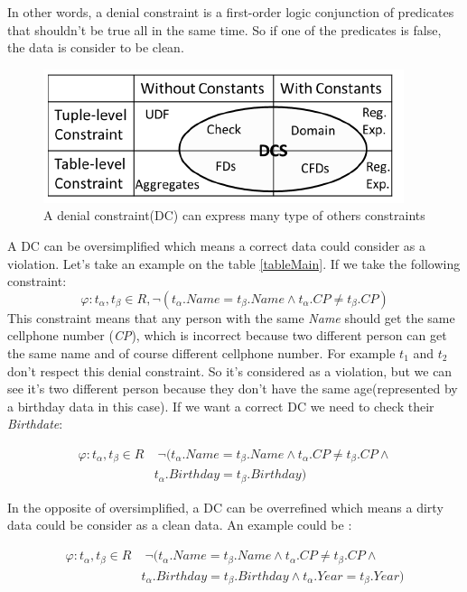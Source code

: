 \documentclass[letterpaper, 12pt]{report}
\begin{document}
In other words, a denial constraint is a first-order logic conjunction of predicates that shouldn't be true all in the same time. So if one of the predicates is false, the data is consider to be clean. \\

\begin{figure}
	\centering
	\includegraphics[scale=1]{img/quadran.png}
	\caption{A denial constraint(DC) can express many type of others constraints}
\end{figure}
A DC can be oversimplified which means a correct data could consider as a violation. Let's take an example on the table \ref{tableMain}. If we take the following constraint:
$$ \varphi : t_\alpha,t_\beta \in R, \neg(t_\alpha.Name = t_\beta.Name \wedge t_\alpha.CP \neq t_\beta.CP)$$
This constraint means that any person with the same \emph{Name} should get the same cellphone number (\emph{CP}), which is incorrect because two different person can get the same name and of course different cellphone number. For example $t_1$ and $t_2$ don't respect this denial constraint. So it's considered as a violation, but we can see it's two different person because they don't have the same age(represented by a birthday data in this case). If we want a correct DC we need to check their \emph{Birthdate}:

\begin{displaymath}
  \begin{split}
    \varphi : t_\alpha,t_\beta \in R &\; \neg(t_\alpha.Name = t_\beta.Name \wedge t_\alpha.CP \neq t_\beta.CP \wedge \\
    & t_\alpha.Birthday = t_\beta.Birthday)
  \end{split}
\end{displaymath}

In the opposite of oversimplified, a DC can be overrefined which means a dirty data could be consider as a clean data. An example could be :

\begin{displaymath}
  \begin{split}
    \varphi : t_\alpha,t_\beta \in R &\; \neg(t_\alpha.Name = t_\beta.Name \wedge t_\alpha.CP \neq t_\beta.CP \wedge \\
    & t_\alpha.Birthday = t_\beta.Birthday \wedge t_\alpha.Year = t_\beta.Year)
  \end{split}
\end{displaymath}
\end{document}
